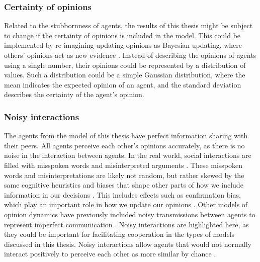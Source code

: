 \documentclass[11pt]{article}
\begin{document}
\subsubsection{Certainty of opinions}
Related to the stubbornness of agents, the results of this thesis might be subject to change if the certainty of opinions is included in the model. This could be implemented by re-imagining updating opinions as Bayesian updating, where others’ opinions act as new evidence \cite{allahverdyan_opinion_2014}. Instead of describing the opinions of agents using a single number, their opinions could be represented by a distribution of values. Such a distribution could be a simple Gaussian distribution, where the mean indicates the expected opinion of an agent, and the standard deviation describes the certainty of the agent’s opinion. 

\subsubsection{Noisy interactions}

\noindent The agents from the model of this thesis have perfect information sharing with their peers. All agents perceive each other's opinions accurately, as there is no noise in the interaction between agents. In the real world, social interactions are filled with misspoken words and misinterpreted arguments \cite{jussim_influence_1989}.
These misspoken words and misinterpretations are likely not random, but rather skewed by the same cognitive heuristics and biases that shape other parts of how we include information in our decisions \cite{arceneaux_cognitive_2012}. This includes effects such as confirmation bias, which play an important role in how we update our opinions \cite{allahverdyan_opinion_2014}. 
Other models of opinion dynamics have previously included noisy transmissions between agents to represent imperfect communication \cite{sirbu2017opinion,su_noise_2017}. Noisy interactions are highlighted here, as they could be important for facilitating cooperation in the types of models discussed in this thesis. Noisy interactions allow agents that would not normally interact positively to perceive each other as more similar by chance \cite{allahverdyan_opinion_2014,su_noise_2017}. 
\end{document}
